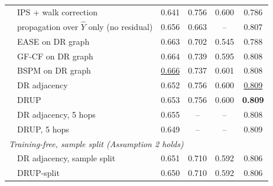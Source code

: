 \begin{tabular}{llcccc}
 & IPS + walk correction & 0.641 & 0.756 & 0.600 & 0.786\\
 & propagation over $\hat Y$ only (no residual) & 0.656 & 0.663 & -- & 0.807\\
 & EASE on DR graph & 0.663 & 0.702 & 0.545 & 0.788\\
 & GF-CF on DR graph & 0.664 & 0.739 & 0.595 & 0.808\\
 & BSPM on DR graph & \underline{0.666} & 0.737 & 0.601 & 0.808\\
 & DR adjacency & 0.652 & 0.756 & 0.600 & \underline{0.809}\\
 & DRUP & 0.653 & 0.756 & 0.600 & \textbf{0.809}\\
 & DR adjacency, 5 hops & 0.655 & -- & -- & 0.808\\
 & DRUP, 5 hops & 0.649 & -- & -- & 0.809\\
\multicolumn{6}{l}{\emph{Training-free, sample split (Assumption 2 holds)}}\\
 & DR adjacency, sample split & 0.651 & 0.710 & 0.592 & 0.806\\
 & DRUP-split & 0.650 & 0.710 & 0.592 & 0.806\\
\bottomrule
\end{tabular}
